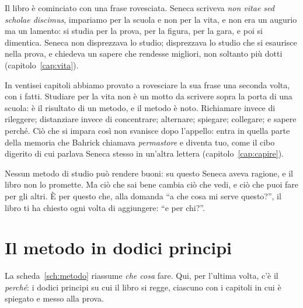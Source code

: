 Il libro è cominciato con una frase rovesciata. Seneca scriveva
\emph{non vitae sed scholae discimus}, impariamo per la scuola e non
per la vita, e non era un augurio ma un lamento: si studia per la
prova, per la figura, per la gara, e poi si dimentica. Seneca non
disprezzava lo studio; disprezzava lo studio che si esaurisce nella
prova, e chiedeva un sapere che rendesse migliori, non soltanto più
dotti (capitolo~\ref{cap:vita}).

In ventisei capitoli abbiamo provato a rovesciare la sua frase una
seconda volta, con i fatti. Studiare per la vita non è un motto da
scrivere sopra la porta di una scuola: è il risultato di un metodo, e
il metodo è noto. Richiamare invece di rileggere; distanziare invece di
concentrare; alternare; spiegare; collegare; e sapere perché. Ciò che
si impara così non svanisce dopo l'appello: entra in quella parte della
memoria che Bahrick chiamava \emph{permastore} e diventa tuo, come il
cibo digerito di cui parlava Seneca stesso in un'altra lettera
(capitolo~\ref{cap:capire}).

Nessun metodo di studio può rendere buoni: su questo Seneca aveva
ragione, e il libro non lo promette. Ma ciò che sai bene cambia ciò che
vedi, e ciò che puoi fare per gli altri. È per questo che, alla domanda
\enquote{a che cosa mi serve questo?}, il libro ti ha chiesto ogni
volta di aggiungere: \enquote{e per chi?}.

\section*{Il metodo in dodici principi}

La scheda~\ref{sch:metodo} riassume \emph{che cosa}
fare. Qui, per l'ultima volta, c'è il \emph{perché}: i dodici principi
su cui il libro si regge, ciascuno con i capitoli in cui è spiegato e
messo alla prova.

